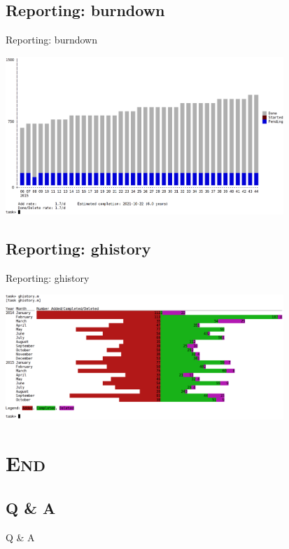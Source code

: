 \documentclass[xcolor=x11names,compress]{beamer}
\renewcommand{\(}{\begin{columns}}
\renewcommand{\)}{\end{columns}}
\newcommand{\<}[1]{\begin{column}{#1}}
\renewcommand{\>}{\end{column}}
\begin{document}
\subsection*{Reporting: burndown}
\begin{frame}[fragile]{Reporting: burndown}
	\begin{center}
		\includegraphics[width=10.5cm]{screenshots/burndown.png}
	\end{center}
\end{frame}

\subsection*{Reporting: ghistory}
\begin{frame}[fragile]{Reporting: ghistory}
	\begin{center}
		\includegraphics[width=10.5cm]{screenshots/ghistory.png}
	\end{center}
\end{frame}

\section{\scshape{End}}

\subsection{Q \& A}
\begin{frame}[fragile]{}
\begin{center}
	\huge{Q \& A}
\end{center}
\end{frame}
\end{document}
